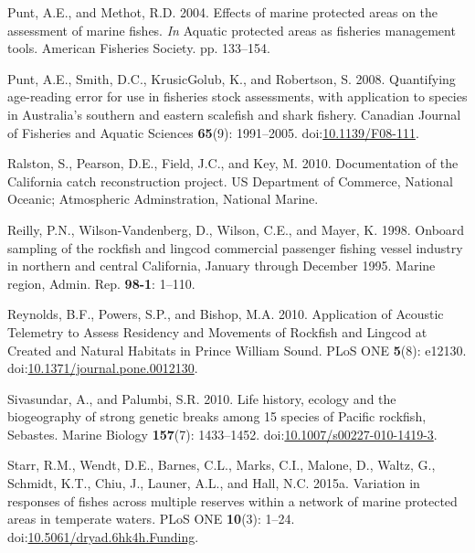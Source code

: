 \documentclass[11pt,
  english,
  letterpaper,
]{article}
\newlength{\cslhangindent}
\newenvironment{CSLReferences}[2] %
 {%
  \setlength{\parindent}{0pt}
  \ifodd #1 \everypar{\setlength{\hangindent}{\cslhangindent}}\ignorespaces\fi
  \ifnum #2 > 0
  \setlength{\parskip}{#2\baselineskip}
  \fi
 }%
 {}
\begin{document}
\begin{CSLReferences}{1}{0}
\leavevmode{}%
Punt, A.E., and Methot, R.D. 2004. Effects of marine protected areas on the assessment of marine fishes. \emph{In} Aquatic protected areas as fisheries management tools. {American} {Fisheries} {Society}. pp. 133--154.

\leavevmode{}%
Punt, A.E., Smith, D.C., KrusicGolub, K., and Robertson, S. 2008. Quantifying age-reading error for use in fisheries stock assessments, with application to species in {Australia}'s southern and eastern scalefish and shark fishery. Canadian Journal of Fisheries and Aquatic Sciences \textbf{65}(9): 1991--2005. doi:\href{https://doi.org/10.1139/F08-111}{10.1139/F08-111}.

\leavevmode{}%
Ralston, S., Pearson, D.E., Field, J.C., and Key, M. 2010. Documentation of the {California} catch reconstruction project. US Department of Commerce, National Oceanic; Atmospheric Adminstration, National Marine.

\leavevmode{}%
Reilly, P.N., Wilson-Vandenberg, D., Wilson, C.E., and Mayer, K. 1998. Onboard sampling of the rockfish and lingcod commercial passenger fishing vessel industry in northern and central {California}, {January} through {December} 1995. Marine region, Admin. Rep. \textbf{98-1}: 1--110.

\leavevmode{}%
Reynolds, B.F., Powers, S.P., and Bishop, M.A. 2010. Application of {Acoustic} {Telemetry} to {Assess} {Residency} and {Movements} of {Rockfish} and {Lingcod} at {Created} and {Natural} {Habitats} in {Prince} {William} {Sound}. PLoS ONE \textbf{5}(8): e12130. doi:\href{https://doi.org/10.1371/journal.pone.0012130}{10.1371/journal.pone.0012130}.

\leavevmode{}%
Sivasundar, A., and Palumbi, S.R. 2010. Life history, ecology and the biogeography of strong genetic breaks among 15 species of {Pacific} rockfish, {Sebastes}. Marine Biology \textbf{157}(7): 1433--1452. doi:\href{https://doi.org/10.1007/s00227-010-1419-3}{10.1007/s00227-010-1419-3}.

\leavevmode{}%
Starr, R.M., Wendt, D.E., Barnes, C.L., Marks, C.I., Malone, D., Waltz, G., Schmidt, K.T., Chiu, J., Launer, A.L., and Hall, N.C. 2015a. Variation in responses of fishes across multiple reserves within a network of marine protected areas in temperate waters. PLoS ONE \textbf{10}(3): 1--24. doi:\href{https://doi.org/10.5061/dryad.6hk4h.Funding}{10.5061/dryad.6hk4h.Funding}.


\end{CSLReferences}
\end{document}
